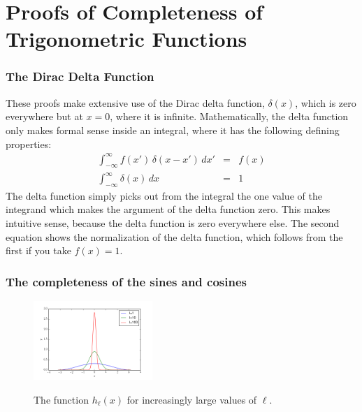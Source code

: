 \documentclass[12pt]{book}
\begin{document}
\appendix






\chapter{Proofs of Completeness of Trigonometric Functions}


\subsection{The Dirac Delta Function}

These proofs make extensive use of the Dirac delta function, $\delta(x)$, which is zero everywhere but at $x=0$, where it is infinite.  Mathematically, the delta function only makes formal sense inside an integral, where it has the following defining properties:
\begin{eqnarray}
\int_{-\infty}^{\infty} f(x') \, \delta(x-x') \, dx' &=& f(x) \\
\int_{-\infty}^{\infty} \delta(x) \, dx &=& 1 \label{eqn:norm}
 \end{eqnarray}
The delta function simply picks out from the integral the one value of the integrand which makes the argument of the delta function zero.  This makes intuitive sense, because the delta function is zero everywhere else.  The second equation shows the normalization of the delta function, which follows from the first if you take $f(x)=1$.





\subsection{The completeness of the sines and cosines}

\begin{figure}[thb]
\begin{center}
{\includegraphics[width=0.40\textwidth]{figs/hk.png}}
\end{center}
\caption{\label{fig:hl} The function $h_\ell(x)$ for increasingly large values of $\ell$.}
\end{figure}
\end{document}
